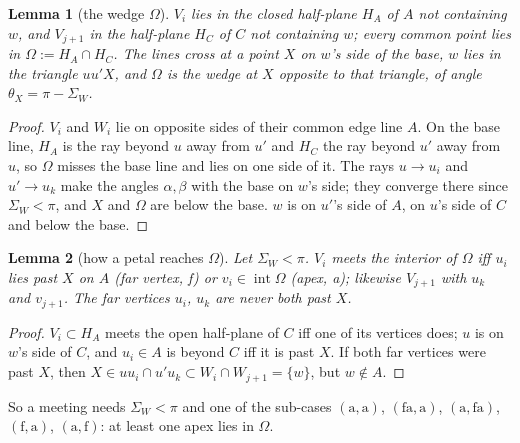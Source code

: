 \documentclass[11pt]{article}
\newtheorem{lemma}{Lemma}
\theoremstyle{definition}
\theoremstyle{remark}
\begin{document}
\begin{lemma}[the wedge $\Omega$]\label{Omega}
$V_i$ lies in the closed half-plane $H_A$ of $A$ not containing $w$, and $V_{j+1}$ in the half-plane $H_C$ of $C$
not containing $w$; every common point lies in $\Omega:=H_A\cap H_C$. The lines cross at a
point $X$ on $w$'s side of the base, $w$ lies in the triangle $uu'X$, and $\Omega$ is the wedge at $X$ opposite to
that triangle, of angle $\theta_X=\pi-\Sigma_W$.
\end{lemma}
\begin{proof}
$V_i$ and $W_i$ lie on opposite sides of their common edge line $A$. On the base line, $H_A$ is the ray beyond $u$
away from $u'$ and $H_C$ the ray beyond $u'$ away from $u$, so $\Omega$ misses the base line and lies on one side
of it. The rays $u\to u_i$ and $u'\to u_k$ make the angles $\alpha,\beta$ with the base on $w$'s side; they converge
there since $\Sigma_W<\pi$, and $X$ and $\Omega$ are below the base.
$w$ is on $u'$'s side of $A$, on $u$'s side of $C$ and below the base.
\end{proof}

\begin{lemma}[how a petal reaches $\Omega$]\label{reach}
Let $\Sigma_W<\pi$. $V_i$ meets the interior of $\Omega$ iff $u_i$ lies past $X$ on $A$ (\emph{far vertex}, f)
or $v_i\in\operatorname{int}\Omega$ (\emph{apex}, a); likewise $V_{j+1}$ with $u_k$ and $v_{j+1}$. The far vertices $u_i$, $u_k$ are
never both past $X$.
\end{lemma}
\begin{proof}
$V_i\subset H_A$ meets the open half-plane of $C$ iff one of its vertices does; $u$ is on $w$'s side of $C$, and
$u_i\in A$ is beyond $C$ iff it is past $X$. If both far vertices were past $X$, then $X\in uu_i\cap u'u_k\subset
W_i\cap W_{j+1}=\{w\}$, but $w\notin A$.
\end{proof}

So a meeting needs $\Sigma_W<\pi$ and one of the sub-cases $(\mathrm a,\mathrm a)$, $(\mathrm{fa},\mathrm a)$,
$(\mathrm a,\mathrm{fa})$, $(\mathrm f,\mathrm a)$, $(\mathrm a,\mathrm f)$: at least one apex lies in $\Omega$.
\end{document}
